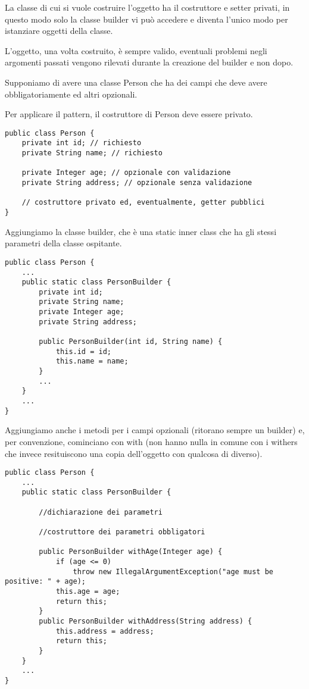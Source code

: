 La classe di cui si vuole costruire l'oggetto ha il costruttore e setter privati, in questo modo solo la classe builder vi può accedere e diventa l’unico modo per 
istanziare oggetti della classe.

L’oggetto, una volta costruito, è sempre valido, eventuali problemi negli argomenti passati vengono rilevati durante la creazione del builder e non dopo.

Supponiamo di avere una classe Person che ha dei campi che deve avere obbligatoriamente ed altri opzionali.

Per applicare il pattern, il costruttore di Person deve essere privato.

\begin{lstlisting}
public class Person {
    private int id; // richiesto
    private String name; // richiesto

    private Integer age; // opzionale con validazione
    private String address; // opzionale senza validazione

    // costruttore privato ed, eventualmente, getter pubblici
}
\end{lstlisting}

Aggiungiamo la classe builder, che è una static inner class che ha gli stessi parametri della classe ospitante.

\begin{lstlisting}
public class Person {
    ...
    public static class PersonBuilder {
        private int id;
        private String name;
        private Integer age;
        private String address;
        
        public PersonBuilder(int id, String name) {
            this.id = id;
            this.name = name;
        }
        ...
    }
    ...
}    
\end{lstlisting}

Aggiungiamo anche i metodi per i campi opzionali (ritorano sempre un builder) e, per convenzione, cominciano con with (non hanno nulla in comune con i withers
che invece resituiscono una copia dell'oggetto con qualcosa di diverso).

\begin{lstlisting}
public class Person {
    ...
    public static class PersonBuilder {
        
        //dichiarazione dei parametri
        
        //costruttore dei parametri obbligatori
        
        public PersonBuilder withAge(Integer age) {
            if (age <= 0)
                throw new IllegalArgumentException("age must be positive: " + age);
            this.age = age;
            return this;
        }
        public PersonBuilder withAddress(String address) {
            this.address = address;
            return this;
        }
    }
    ...
}       
\end{lstlisting}


